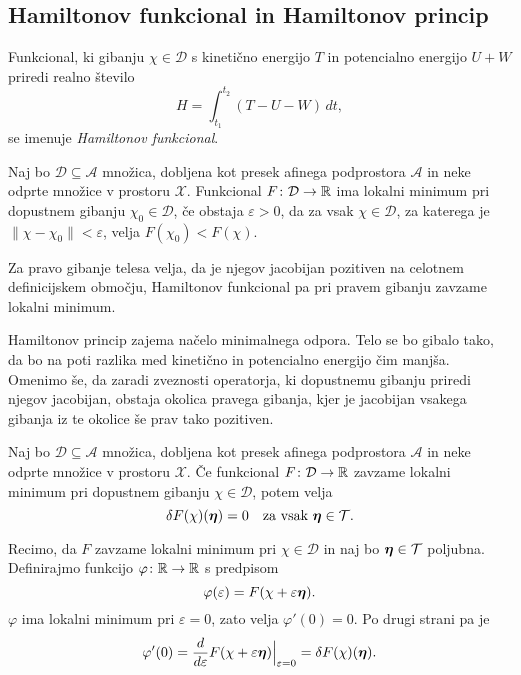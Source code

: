\subsection{Hamiltonov funkcional in Hamiltonov princip}


\begin{definicija}
	Funkcional, ki gibanju $\chi\in \mathcal{D}$ s kinetično energijo $T$ in potencialno
	energijo $U+W$ priredi realno število
	\[
		H=\int_{t_1}^{t_2}(T-U-W)\,dt,
	\]
	se imenuje \emph{Hamiltonov funkcional}.
\end{definicija}

\begin{definicija}
	Naj bo $\mathcal{D}\subseteq\mathcal{A}$ množica, dobljena kot presek afinega podprostora $\mathcal{A}$ in
	neke odprte množice v prostoru $\mathcal{X}$.
	Funkcional $F\colon \mathcal{D}\to\mathbb R$ ima lokalni minimum pri dopustnem gibanju
	$\chi_{0}\in \mathcal{D}$, če obstaja $\varepsilon >0$,
	da za vsak $\chi\in \mathcal{D}$, za katerega je $\|\chi-\chi_{0}\|<\varepsilon$, velja $F(\chi_{0})<F(\chi)$.
\end{definicija}

\begin{hampri}
	Za pravo gibanje telesa velja, da je njegov jacobijan pozitiven na
	celotnem definicijskem območju, Hamiltonov funkcional pa pri pravem gibanju
	zavzame lokalni minimum.
\end{hampri}

Hamiltonov princip zajema načelo minimalnega odpora. Telo se bo gibalo tako, da
bo na poti razlika med kinetično in potencialno energijo čim manjša. Omenimo še, da zaradi zveznosti operatorja,
ki dopustnemu gibanju priredi njegov jacobijan, obstaja okolica pravega gibanja,
kjer je jacobijan vsakega gibanja iz te okolice še prav tako pozitiven.

\begin{trditev}
	Naj bo $\mathcal{D}\subseteq\mathcal{A}$ množica, dobljena kot presek afinega podprostora $\mathcal{A}$ in
	neke odprte množice v prostoru $\mathcal{X}$.
	Če funkcional $F\colon \mathcal{D}\to\mathbb R$ zavzame lokalni minimum pri dopustnem gibanju $\chi\in\mathcal{D}$, potem velja
	\[ \delta F(\chi)(\vek{\eta})=0\quad\textrm{za vsak}\ \vek{\eta}\in\mathcal{T}. \]
\end{trditev}

\proof
	Recimo, da $F$ zavzame lokalni minimum pri $\chi\in\mathcal{D}$ in naj bo $\boldsymbol \eta\in\mathcal{T}$ poljubna.
	Definirajmo funkcijo $\varphi\colon\mathbb R\to\mathbb R$ s predpisom
	\[ \varphi(\varepsilon)=F(\chi+\varepsilon\boldsymbol \eta). \]
	$\varphi$ ima lokalni minimum pri $\varepsilon=0$, zato velja $\varphi'(0)=0.$
	Po drugi strani pa je
	\[
		\varphi'(0)=\frac{d}{d\varepsilon}F(\chi+\varepsilon\boldsymbol \eta)\Big|_{\varepsilon=0}=
		\delta F(\chi)(\boldsymbol \eta).
	\]
\endproof

